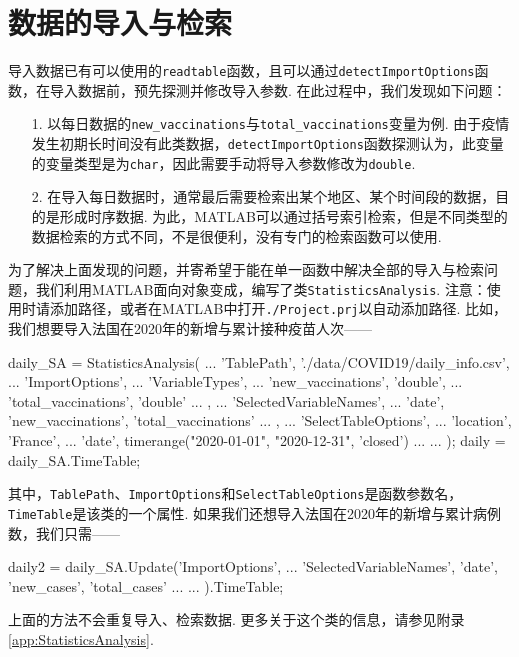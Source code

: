 \documentclass[a4paper, titlepage]{article}
\begin{document}
    \section{数据的导入与检索}\label{数据的导入}
        导入数据已有可以使用的\texttt{readtable}函数，且可以通过\texttt{detectImportOptions}函数，在导入数据前，预先探测并修改导入参数. 在此过程中，我们发现如下问题：
        \begin{enumerate}
            \item [1.] 以每日数据的\texttt{new\_vaccinations}与\texttt{total\_vaccinations}变量为例. 由于疫情发生初期长时间没有此类数据，\texttt{detectImportOptions}函数探测认为，此变量的变量类型是为\texttt{char}，因此需要手动将导入参数修改为\texttt{double}.
            \item [2.] 在导入每日数据时，通常最后需要检索出某个地区、某个时间段的数据，目的是形成时序数据. 为此，MATLAB可以通过括号索引检索，但是不同类型的数据检索的方式不同，不是很便利，没有专门的检索函数可以使用.
        \end{enumerate}
        为了解决上面发现的问题，并寄希望于能在单一函数中解决全部的导入与检索问题，我们利用MATLAB面向对象变成，编写了类\texttt{StatisticsAnalysis}. {\color{red}
        \kaishu 注意：使用时请添加路径，或者在MATLAB中打开\texttt{./Project.prj}以自动添加路径.} 比如，我们想要导入法国在2020年的新增与累计接种疫苗人次——
\begin{matlabcode}
daily_SA = StatisticsAnalysis( ...
    'TablePath', './data/COVID19/daily_info.csv', ...
    'ImportOptions', { ...
        'VariableTypes', { ...
            'new_vaccinations', 'double', ...
            'total_vaccinations', 'double' ...
            }, ...
        'SelectedVariableNames', ...
            {'date', 'new_vaccinations', 'total_vaccinations'} ...
        }, ...
    'SelectTableOptions', { ...
        'location', 'France', ...
        'date', timerange("2020-01-01", "2020-12-31", 'closed') ...
        } ...
    );
daily = daily_SA.TimeTable;
\end{matlabcode}
        其中，\texttt{TablePath}、\texttt{ImportOptions}和\texttt{SelectTableOptions}是函数参数名，\texttt{TimeTable}是该类的一个属性. 如果我们还想导入法国在2020年的新增与累计病例数，我们只需——
\begin{matlabcode}
daily2 = daily_SA.Update('ImportOptions', { ...
        'SelectedVariableNames', {'date', 'new_cases', 'total_cases'} ...
        }...
    ).TimeTable;
\end{matlabcode}
        上面的方法不会重复导入、检索数据. 更多关于这个类的信息，请参见附录\ref{app:StatisticsAnalysis}. 
\end{document}
